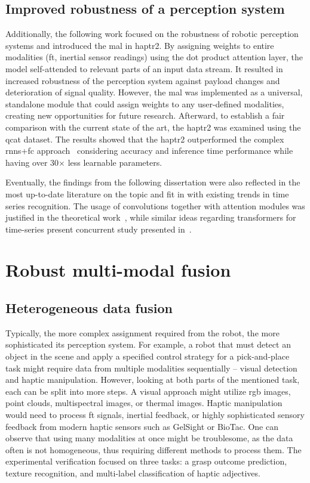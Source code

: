 \documentclass[a4paper, 10pt, twoside]{report}
\begin{document}
\section{Improved robustness of a perception system} 

Additionally, the following work focused on the robustness of robotic perception systems and introduced the \acrshort{mal} in \acrshort{haptr}2. By assigning weights to entire modalities (\acrshort{ft}, inertial sensor readings) using the dot product attention layer, the model self-attended to relevant parts of an input data stream. It resulted in increased robustness of the perception system against payload changes and deterioration of signal quality. However, the \acrshort{mal} was implemented as a universal, standalone module that could assign weights to any user-defined modalities, creating new opportunities for future research. Afterward, to establish a fair comparison with the current state of the art, the \acrshort{haptr}2 was examined using the \acrshort{qcat} dataset. The results showed that the \acrshort{haptr}2 outperformed the complex \acrshort{rnn}s+\acrshort{fc} approach~\cite{Ahmadi2021} considering accuracy and inference time performance while having over 30$\times$ less learnable parameters.

Eventually, the findings from the following dissertation were also reflected in the most up-to-date literature on the topic and fit in with existing trends in time series recognition. The usage of convolutions together with attention modules was justified in the theoretical work~\cite{park2022how}, while similar ideas regarding transformers for time-series present concurrent study presented in~\cite{TST}. 

\chapter{Robust multi-modal fusion}
\label{part:conclusions:fusion}
 
\section{Heterogeneous data fusion}
 
Typically, the more complex assignment required from the robot, the more sophisticated its perception system. For example, a robot that must detect an object in the scene and apply a specified control strategy for a pick-and-place task might require data from multiple modalities sequentially -- visual detection and haptic manipulation. However, looking at both parts of the mentioned task, each can be split into more steps. A visual approach might utilize \acrshort{rgb} images, point clouds, multispectral images, or thermal images. Haptic manipulation would need to process \acrshort{ft} signals, inertial feedback, or highly sophisticated sensory feedback from modern haptic sensors such as GelSight or BioTac. One can observe that using many modalities at once might be troublesome, as the data often is not homogeneous, thus requiring different methods to process them. The experimental verification focused on three tasks: a grasp outcome prediction, texture recognition, and multi-label classification of haptic adjectives.
\end{document}

